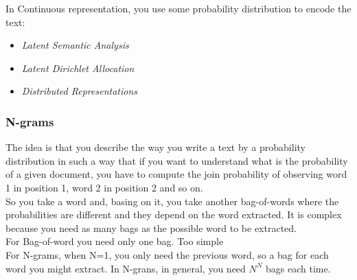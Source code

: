 



In Continuous representation, you use some probability distribution to encode the text:
\begin{itemize}
    \item \textit{Latent Semantic Analysis}
    \item \textit{Latent Dirichlet Allocation}
    \item \textit{Distributed Representations}
\end{itemize}{}



\subsubsection{N-grams}
The idea is that you describe the way you write a text by a probability distribution in such a way that if you want to understand what is the probability of a given document, you have to compute the join probability of observing word 1 in position 1, word 2 in position 2 and so on. \\
So you take a word and, basing on it, you take another bag-of-words where the probabilities are different and they depend on the word extracted. It is complex because you need as many bags as the possible word to be extracted. \\
For Bag-of-word you need only one bag. Too simple \\
For N-grams, when N=1, you only need the previous word, so a bag for each word you might extract. In N-grans, in general, you need $N^N$ bags each time. \\

